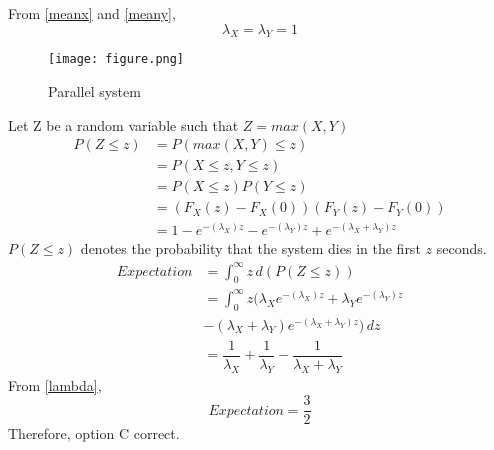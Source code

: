\documentclass[journal,12pt,twocolumn]{IEEEtran}
\begin{document}
From \ref{meanx} and \ref{meany},
\begin{equation}\label{lambda}
    \lambda_X = \lambda_Y = 1
\end{equation}
\begin{figure}[h]
    \centering
    \texttt{[image: figure.png]}
    \caption{Parallel system}
    \label{fig:fig_label}
\end{figure}
Let Z be a random variable such that $Z=max(X,Y)$
\begin{align}
    P(Z\leq z) &= P(max(X,Y) \leq z)
    \\
    &=P(X\leq z,Y\leq z)
    \\
    &=P(X\leq z) P(Y\leq z)
    \\
    &=(F_X(z)-F_X(0)) (F_Y(z)-F_Y(0))
    \\
    &=1-e^{-(\lambda_X) z}-e^{-(\lambda_Y) z}+e^{-(\lambda_X+\lambda_Y) z}
\end{align}
$P(Z\leq z)$ denotes the probability that the system dies in the first $z$ seconds.\\
\begin{align}
    Expectation &= \int_{0}^{\infty}z \,d(P(Z\leq z))
    \\
\nonumber    &=\int_{0}^{\infty}z(\lambda_Xe^{-(\lambda_X) z}+\lambda_Ye^{-(\lambda_Y) z}\\
&-(\lambda_X+\lambda_Y)e^{-(\lambda_X+\lambda_Y) z}) \,dz
    \\
    &= \dfrac{1}{\lambda_X}+\dfrac{1}{\lambda_Y}-\dfrac{1}{\lambda_X+\lambda_Y}
\end{align}
From \ref{lambda}, 
\begin{equation}
    Expectation=\dfrac{3}{2}
\end{equation}
Therefore, option C correct.
\\
\end{document}
